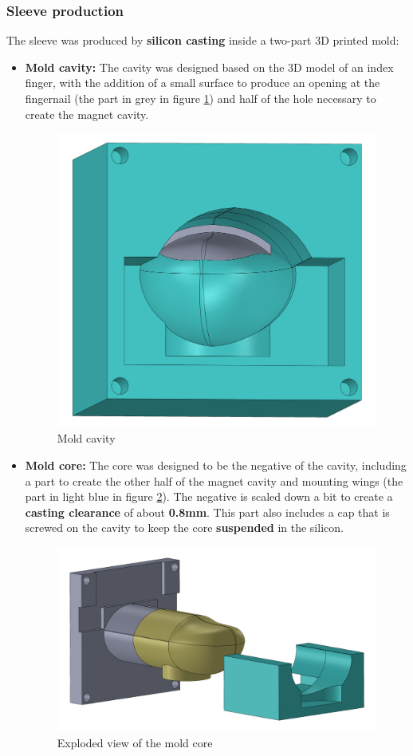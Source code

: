 \subsubsection{Sleeve production}
\label{sec: Sleeve_production}

\begin{samepage}
    The sleeve was produced by \textbf{silicon casting} inside a two-part 3D printed mold:
    \nopagebreak

    \begin{itemize}
        \item \textbf{Mold cavity: } The cavity was designed based on the 3D model of an index finger, with the addition of a small surface to produce an opening at the fingernail (the part in grey in figure \ref{fig: mold_cavity}) and half of the hole necessary to create the magnet cavity.
        \begin{figure}[H]
            \centering
            \includegraphics[width=0.4\linewidth]{Chapters/Chapter5/Rigid_Prototypes/Figures/silicon_finger_mold_cavity.PNG}
            \caption{Mold cavity}
            \label{fig: mold_cavity}
        \end{figure}

        \item \textbf{Mold core: } The core was designed to be the negative of the cavity, including a part to create the other half of the magnet cavity and mounting wings (the part in light blue in figure \ref{fig: mold_core}).
        The negative is scaled down a bit to create a \textbf{casting clearance} of about \textbf{0.8mm}.
        This part also includes a cap that is screwed on the cavity to keep the core \textbf{suspended} in the silicon.
        \begin{figure}[H]
            \centering
            \includegraphics[width=0.5\linewidth]{Chapters/Chapter5/Rigid_Prototypes/Figures/silicon_finger_mold_core.PNG}
            \caption{Exploded view of the mold core}
            \label{fig: mold_core}
        \end{figure}
    \end{itemize}
\end{samepage}


